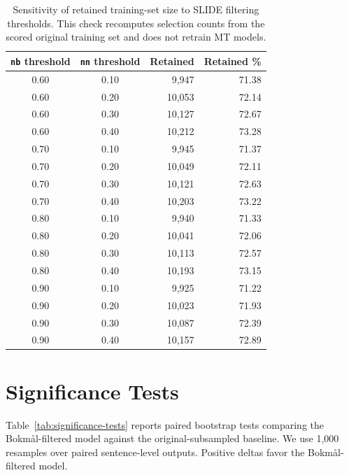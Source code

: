 \documentclass[11pt]{article}
\newcommand{\nb}{Bokm{\aa}l}
\begin{document}
\begin{table}[h]
\centering
\small
\begin{tabular}{ccrr}
\toprule
\texttt{nb} threshold & \texttt{nn} threshold & Retained & Retained \% \\
\midrule
0.60 & 0.10 & 9,947 & 71.38 \\
0.60 & 0.20 & 10,053 & 72.14 \\
0.60 & 0.30 & 10,127 & 72.67 \\
0.60 & 0.40 & 10,212 & 73.28 \\
0.70 & 0.10 & 9,945 & 71.37 \\
0.70 & 0.20 & 10,049 & 72.11 \\
0.70 & 0.30 & 10,121 & 72.63 \\
0.70 & 0.40 & 10,203 & 73.22 \\
0.80 & 0.10 & 9,940 & 71.33 \\
0.80 & 0.20 & 10,041 & 72.06 \\
0.80 & 0.30 & 10,113 & 72.57 \\
0.80 & 0.40 & 10,193 & 73.15 \\
0.90 & 0.10 & 9,925 & 71.22 \\
0.90 & 0.20 & 10,023 & 71.93 \\
0.90 & 0.30 & 10,087 & 72.39 \\
0.90 & 0.40 & 10,157 & 72.89 \\
\bottomrule
\end{tabular}
\caption{Sensitivity of retained training-set size to SLIDE filtering thresholds. This check recomputes selection counts from the scored original training set and does not retrain MT models.}
\label{tab:threshold-sensitivity}
\end{table}

\section{Significance Tests}
\label{app:significance-tests}

Table~\ref{tab:significance-tests} reports paired bootstrap tests comparing the \nb{}-filtered model against the original-subsampled baseline. We use 1,000 resamples over paired sentence-level outputs. Positive deltas favor the \nb{}-filtered model.
\end{document}
